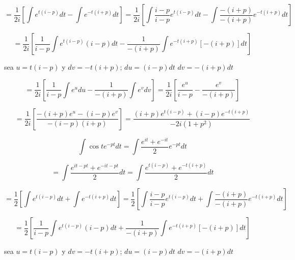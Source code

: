 \documentclass[12pt,a4paper]{article}
\begin{document}
\begin{enumerate}
    \begin{equation*}
        =\frac{1}{2i}\left[ \int e^{t(i-p)}dt-\int e^{-t(i+p)}dt\right]=\frac{1}{2i}\left[ \int \frac{i-p}{i-p}e^{t(i-p)}dt-\int\frac{-(i+p)}{-(i+p)} e^{-t(i+p)}dt\right]
    \end{equation*}
    
    \begin{equation*}
        =\frac{1}{2i}\left[\frac{1}{i-p} \int  e^{t(i-p)}(i-p)dt- \frac{1}{-(i+p)} \int e^{-t(i+p)}[-(i+p)]dt\right]
    \end{equation*} 
    
    sea $u=t(i-p)$ y $dv=-t(i+p)$; $du=(i-p)dt$ $dv= -(i+p)dt$
    
    \begin{equation*}
        =\frac{1}{2i}\left[\frac{1}{i-p} \int  e^{u}du- \frac{1}{-(i+p)} \int e^{v}dv\right]=\frac{1}{2i}\left[\frac{e^{u}}{i-p}- \frac{e^{v}}{-(i+p)}\right]
    \end{equation*}
    
    \begin{equation*}
        =\frac{1}{2i}\left[\frac{-(i+p)e^{u}-(i-p)e^{v}}{-(i-p)(i+p)}\right]=\frac{(i+p)e^{t(i-p)}+(i-p)e^{-t(i+p)}}{-2i(1+p^2)}
    \end{equation*}
    
    
    
    
    \begin{equation*}
        \int \cos{t}e^{-pt}dt=\int \frac{e^{it}+e^{-it}}{2}e^{-pt}dt
    \end{equation*}
    
    \begin{equation*}
        = \int \frac{e^{it-pt}+e^{-it-pt}}{2}dt= \int \frac{e^{t(i-p)}+e^{-t(i+p)}}{2}dt
    \end{equation*}
    
    \begin{equation*}
        =\frac{1}{2}\left[ \int e^{t(i-p)}dt+\int e^{-t(i+p)}dt\right]=\frac{1}{2}\left[ \int \frac{i-p}{i-p}e^{t(i-p)}dt+\int\frac{-(i+p)}{-(i+p)} e^{-t(i+p)}dt\right]
    \end{equation*}
    
    \begin{equation*}
        =\frac{1}{2}\left[\frac{1}{i-p} \int  e^{t(i-p)}(i-p)dt+ \frac{1}{-(i+p)} \int e^{-t(i+p)}[-(i+p)]dt\right]
    \end{equation*} 
    
    sea $u=t(i-p)$ y $dv=-t(i+p)$; $du=(i-p)dt$ $dv= -(i+p)dt$
    

\end{enumerate}
\end{document}
